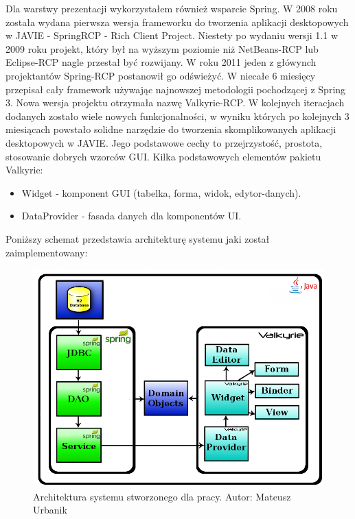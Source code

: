 Dla warstwy prezentacji wykorzystałem również wsparcie Spring. W 2008 roku została wydana pierwsza wersja frameworku do tworzenia aplikacji desktopowych w JAVIE - SpringRCP - Rich Client Project. Niestety po wydaniu wersji 1.1 w 2009 roku projekt, który był na wyższym poziomie niż NetBeans-RCP lub Eclipse-RCP nagle przestał być rozwijany. W roku 2011 jeden z główynch projektantów Spring-RCP postanowił go odświeżyć. W niecałe 6 miesięcy przepisał cały framework używając najnowszej metodologii pochodzącej z Spring 3. Nowa wersja projektu otrzymała nazwę Valkyrie-RCP\cite{valkyrie_reference}. W kolejnych iteracjach dodanych zostało wiele nowych funkcjonalności, w wyniku których po kolejnych 3 miesiącach powstało solidne narzędzie do tworzenia skomplikowanych aplikacji desktopowych w JAVIE. Jego podstawowe cechy to przejrzystość, prostota, stosowanie dobrych wzorców GUI. Kilka podstawowych elementów pakietu Valkyrie:
\begin{itemize}
 \item Widget - komponent GUI (tabelka, forma, widok, edytor-danych).
 \item DataProvider - fasada danych dla komponentów UI.
\end{itemize}

Poniższy schemat przedstawia architekturę systemu jaki został zaimplementowany:

\begin{figure}[!ht]
\label{img:rysunek_spring2}
\includegraphics[scale=0.4]{images/spring-layers2}
\caption[Rysunek przedstawiający model architektury systemu]{Architektura systemu stworzonego dla pracy. Autor: Mateusz Urbanik}
\end{figure}

